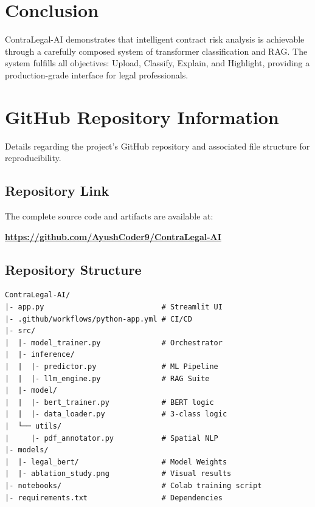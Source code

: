 \documentclass[conference]{IEEEtran}
\begin{document}
\section{Conclusion}
ContraLegal-AI demonstrates that intelligent contract risk analysis is achievable through a carefully composed system of transformer classification and RAG. The system fulfills all objectives: Upload, Classify, Explain, and Highlight, providing a production-grade interface for legal professionals.




\appendix

\section{GitHub Repository Information}

Details regarding the project's GitHub repository and associated file structure for reproducibility.

\subsection{Repository Link}
The complete source code and artifacts are available at:

\begin{center}
\textbf{\url{https://github.com/AyushCoder9/ContraLegal-AI}}
\end{center}

\subsection{Repository Structure}
\begin{lstlisting}
ContraLegal-AI/
|- app.py                           # Streamlit UI
|- .github/workflows/python-app.yml # CI/CD
|- src/
|  |- model_trainer.py              # Orchestrator
|  |- inference/
|  |  |- predictor.py               # ML Pipeline
|  |  |- llm_engine.py              # RAG Suite
|  |- model/
|  |  |- bert_trainer.py            # BERT logic
|  |  |- data_loader.py             # 3-class logic
|  └── utils/
|     |- pdf_annotator.py           # Spatial NLP
|- models/
|  |- legal_bert/                   # Model Weights
|  |- ablation_study.png            # Visual results
|- notebooks/                       # Colab training script
|- requirements.txt                 # Dependencies
\end{lstlisting}
\end{document}
